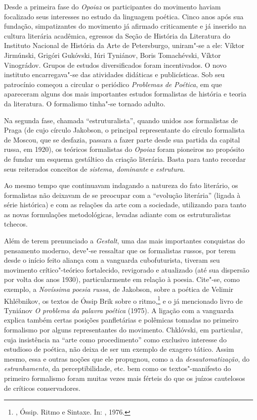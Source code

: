 Desde a primeira fase do \emph{Opoiaz} os participantes do movimento
haviam focalizado seus interesses no estudo da linguagem poética. Cinco
anos após sua fundação, simpatizantes do movimento já afirmado
criticamente e já inserido na cultura literária acadêmica, egressos da
Seção de História da Literatura do Instituto Nacional de História da
Arte de Petersburgo, uniram"-se a ele: Víktor Jirmúnski, Grigóri Gukóvski, Iúri
Tyniánov, Boris Tomachévski, Víktor Vinográdov. Grupos de estudos
diversificados foram incentivados. O novo instituto encarregava"-se das
atividades didáticas e publicísticas. Sob seu patrocínio começou a
circular o periódico \emph{Problemas de Poética}, em que apareceram alguns
dos mais importantes estudos formalistas de história e teoria da
literatura. O formalismo tinha"-se tornado adulto.

Na segunda fase, chamada ``estruturalista'', quando unidos aos
formalistas de Praga (de cujo círculo Jakobson, o principal
representante do círculo formalista de Moscou, que se desfazia,
passara a fazer parte desde sua partida da capital russa, em 1920), os
teóricos formalistas do \emph{Opoiaz} foram pioneiros no propósito de
fundar um esquema gestáltico da criação literária. Basta para tanto
recordar seus reiterados conceitos de \emph{sistema, dominante} e
\emph{estrutura}.

Ao mesmo tempo que continuavam indagando a natureza do fato literário,
os formalistas não deixavam de se preocupar com a ``evolução literária''
 (ligada à série histórica) e com as relações da arte com a sociedade, utilizando para
tanto as novas formulações metodológicas, levadas
adiante com os estruturalistas tchecos.

Além de terem prenunciado a \emph{Gestalt}, uma das
mais importantes conquistas do pensamento moderno, deve"-se ressaltar que
os formalistas russos, por terem desde o início feito aliança com a
vanguarda cubofuturista, tiveram seu movimento crítico"-teórico
fortalecido, revigorado e atualizado (até sua dispersão por volta dos
anos 1930), particularmente em relação à poesia. Cite"-se, como exemplo, a
\emph{Novíssima poesia russa}, de Jakobson, sobre a poética de Velimir
Khlébnikov, os textos de Óssip Brik sobre o ritmo,\footnote{, Óssip. Ritmo e Sintaxe. In: 
, 1976.} e o já mencionado
livro de Tyniánov \emph{O problema da palavra poética} (1975). A ligação com a
vanguarda explica também certas posições panfletárias e polêmicas
tomadas no primeiro formalismo por alguns representantes do movimento.
Chklóvski, em particular, cuja insistência na ``arte como
procedimento'' como exclusivo interesse do estudioso de
poética, não deixa de ser um exemplo de exagero tático. Assim mesmo, essa e outras noções que ele propugnou, como a
da \emph{desautomatização}, do \emph{estranhamento}, da perceptibilidade, etc. bem
como os textos"-manifesto do primeiro formalismo foram muitas vezes mais
férteis do que os juízos cautelosos de críticos conservadores.

